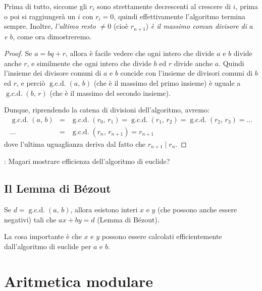 \documentclass[pdflatex,11pt,a4paper,oneside]{article}
\newcommand{\XXX}[1][XXX]{\text{\bfseries{\color{red}{\emph{#1}}}}}
\newcommand{\TODO}[0]{\XXX[TODO]}
\newcommand{\divides}[0]{\mid}
\newcommand{\gcdop}[0]{\ensuremath{\operatorname{g.c.d.}}}
\newcommand{\xgcd}[1]{\ensuremath{\gcdop\left({#1}\right)}}
\renewcommand{\gcd}[2]{\xgcd{{#1},\,{#2}}}
\begin{document}
Prima di tutto, siccome gli $r_i$ sono strettamente decrescenti al
crescere di $i$, prima o poi si raggiunger\`a un $i$ con $r_i = 0$,
quindi effettivamente l'algoritmo termina sempre.  Inoltre, \emph{l'ultimo
resto $\neq 0$} (cio\`e $r_{n+1}$) \emph{\`e il massimo comun divisore di
$a$ e $b$}, come ora dimostreremo.

\begin{proof}
Se $a = bq + r$, allora \`e facile vedere che ogni intero che divide
$a$ e $b$ divide anche $r$, e similmente che ogni intero che divide $b$
ed $r$ divide anche $a$.  Quindi l'insieme dei divisore comuni di $a$ e
$b$ concide con l'insieme de divisori comuni di $b$ ed $r$, e perci\`o
$\gcd{a}{b}$ (che \`e il massimo del primo insieme) \`e uguale a
$\gcd{b}{r}$ (che \`e il massimo del secondo insieme).

\smallskip
\noindent
Dunque, riprendendo la catena di divisioni dell'algoritmo, avremo:
\begin{eqnarray*}
  \gcd{a}{b}
    & =
    & \gcd{r_0}{r_1} = \gcd{r_1}{r_2} = \gcd{r_2}{r_3} = \ldots \\
  \ldots
    & =
    & \gcd{r_n}{r_{n+1}} = r_{n+1}
\end{eqnarray*}
dove l'ultima uguaglianza deriva dal fatto che $r_{n+1} \divides r_n$.
\end{proof}

\noindent
\TODO: Magari mostrare efficienza dell'algoritmo di euclide?


\subsection{Il Lemma di B\'ezout}

Se $d = \gcd{a}{b}$, allora esistono interi $x$ e $y$ (che possono 
anche essere negativi) tali che $ax + by = d$ (Lemma di B\'ezout).

La cosa importante \`e che $x$ e $y$ possono essere calcolati
efficientemente dall'algoritmo di euclide per $a$ e $b$.


\section{Aritmetica modulare}

\end{document}

